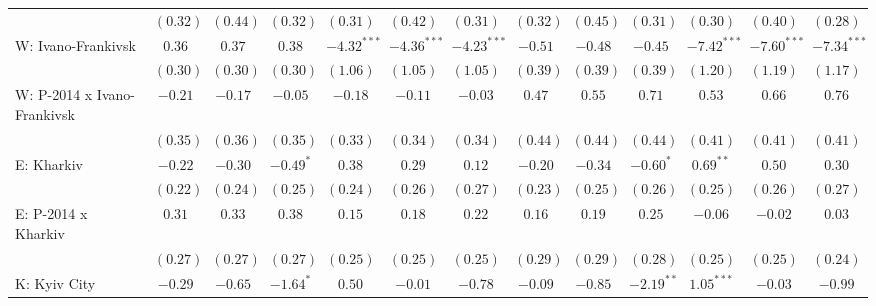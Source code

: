 \begin{table}
\begin{center}
\begin{tiny}
\begin{tabular}{l c c c c c c c c c c c c}
                            & $(0.32)$      & $(0.44)$     & $(0.32)$      & $(0.31)$       & $(0.42)$       & $(0.31)$       & $(0.32)$      & $(0.45)$    & $(0.31)$       & $(0.30)$       & $(0.40)$       & $(0.28)$       \\
W: Ivano-Frankivsk          & $0.36$        & $0.37$       & $0.38$        & $-4.32^{***}$  & $-4.36^{***}$  & $-4.23^{***}$  & $-0.51$       & $-0.48$     & $-0.45$        & $-7.42^{***}$  & $-7.60^{***}$  & $-7.34^{***}$  \\
                            & $(0.30)$      & $(0.30)$     & $(0.30)$      & $(1.06)$       & $(1.05)$       & $(1.05)$       & $(0.39)$      & $(0.39)$    & $(0.39)$       & $(1.20)$       & $(1.19)$       & $(1.17)$       \\
W: P-2014 x Ivano-Frankivsk & $-0.21$       & $-0.17$      & $-0.05$       & $-0.18$        & $-0.11$        & $-0.03$        & $0.47$        & $0.55$      & $0.71$         & $0.53$         & $0.66$         & $0.76$         \\
                            & $(0.35)$      & $(0.36)$     & $(0.35)$      & $(0.33)$       & $(0.34)$       & $(0.34)$       & $(0.44)$      & $(0.44)$    & $(0.44)$       & $(0.41)$       & $(0.41)$       & $(0.41)$       \\
E: Kharkiv                  & $-0.22$       & $-0.30$      & $-0.49^{*}$   & $0.38$         & $0.29$         & $0.12$         & $-0.20$       & $-0.34$     & $-0.60^{*}$    & $0.69^{**}$    & $0.50$         & $0.30$         \\
                            & $(0.22)$      & $(0.24)$     & $(0.25)$      & $(0.24)$       & $(0.26)$       & $(0.27)$       & $(0.23)$      & $(0.25)$    & $(0.26)$       & $(0.25)$       & $(0.26)$       & $(0.27)$       \\
E: P-2014 x Kharkiv         & $0.31$        & $0.33$       & $0.38$        & $0.15$         & $0.18$         & $0.22$         & $0.16$        & $0.19$      & $0.25$         & $-0.06$        & $-0.02$        & $0.03$         \\
                            & $(0.27)$      & $(0.27)$     & $(0.27)$      & $(0.25)$       & $(0.25)$       & $(0.25)$       & $(0.29)$      & $(0.29)$    & $(0.28)$       & $(0.25)$       & $(0.25)$       & $(0.24)$       \\
K: Kyiv City                & $-0.29$       & $-0.65$      & $-1.64^{*}$   & $0.50$         & $-0.01$        & $-0.78$        & $-0.09$       & $-0.85$     & $-2.19^{**}$   & $1.05^{***}$   & $-0.03$        & $-0.99$        \\

\end{tabular}
\end{tiny}
\end{center}
\end{table}
